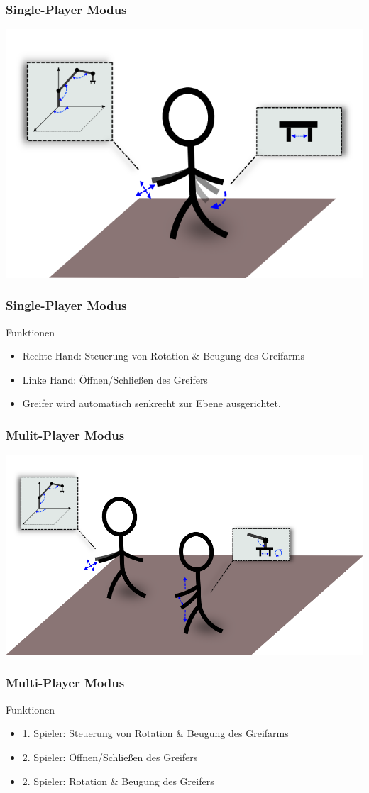 \begin{frame}
\frametitle{Single-Player Modus}
\begin{center}
\includegraphics[scale=0.4]{imgs/singleplayer.png}
\end{center}
\end{frame}

\begin{frame}
\frametitle{Single-Player Modus}
\begin{block}{Funktionen}
\begin{itemize}
\item Rechte Hand: Steuerung von Rotation \& Beugung des Greifarms
\item Linke Hand: Öffnen/Schließen des Greifers
\item Greifer wird automatisch senkrecht zur Ebene ausgerichtet.
\end{itemize}
\end{block}

\end{frame}


\begin{frame}
\frametitle{Mulit-Player Modus}
\begin{center}
\includegraphics[scale=0.4]{imgs/multiplayer.png}
\end{center}
\end{frame}

\begin{frame}
\frametitle{Multi-Player Modus}
\begin{block}{Funktionen}
\begin{itemize}
\item 1. Spieler: Steuerung von Rotation \& Beugung des Greifarms
\item 2. Spieler: Öffnen/Schließen des Greifers
\item 2. Spieler: Rotation \& Beugung des Greifers
\end{itemize}
\end{block}
\end{frame}